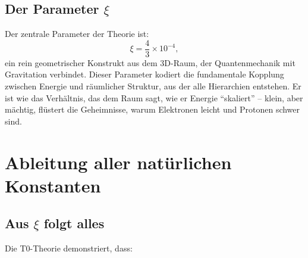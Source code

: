	\subsection{Der Parameter $\xi$}
	Der zentrale Parameter der Theorie ist:
	\[
	\xi = \frac{4}{3} \times 10^{-4},
	\]
	ein rein geometrischer Konstrukt aus dem 3D-Raum, der Quantenmechanik mit Gravitation verbindet. Dieser Parameter kodiert die fundamentale Kopplung zwischen Energie und räumlicher Struktur, aus der alle Hierarchien entstehen. Er ist wie das Verhältnis, das dem Raum sagt, wie er Energie ``skaliert'' – klein, aber mächtig, flüstert die Geheimnisse, warum Elektronen leicht und Protonen schwer sind.
	
	\section{Ableitung aller natürlichen Konstanten}
	
	\subsection{Aus $\xi$ folgt alles}
	Die T0-Theorie demonstriert, dass:
	
